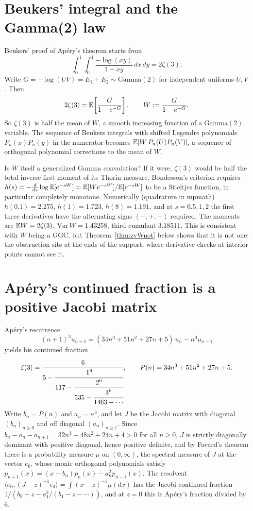 \section{Beukers' integral and the Gamma(2) law}

Beukers' proof of Ap\'ery's theorem \cite{beukers1979} starts from
\[
\int_0^1\!\!\int_0^1\frac{-\log(xy)}{1-xy}\,dx\,dy=2\zeta(3).
\]
Write $G=-\log(UV)=E_1+E_2\sim\mathrm{Gamma}(2)$ for independent uniforms $U,V$. Then
\[
2\zeta(3)=\mathbb{E}\!\left[\frac{G}{1-e^{-G}}\right],\qquad W:=\frac{G}{1-e^{-G}}.
\]
So $\zeta(3)$ is half the mean of $W$, a smooth increasing function of a Gamma$(2)$ variable. The sequence of Beukers integrals with shifted Legendre polynomials $P_n(x)P_n(y)$ in the numerator becomes $\mathbb{E}[W\,P_n(U)P_n(V)]$, a sequence of orthogonal polynomial corrections to the mean of $W$.

Is $W$ itself a generalized Gamma convolution? If it were, $\zeta(3)$ would be half the total inverse first moment of its Thorin measure. Bondesson's criterion \cite{bondesson1992} requires $h(s)=-\frac{d}{ds}\log\mathbb{E}[e^{-sW}]=\mathbb{E}[We^{-sW}]/\mathbb{E}[e^{-sW}]$ to be a Stieltjes function, in particular completely monotone. Numerically (quadrature in mpmath) $h(0.1)=2.275$, $h(1)=1.723$, $h(8)=1.191$, and at $s=0.5,1,2$ the first three derivatives have the alternating signs $(-,+,-)$ required. The moments are $\mathbb{E} W=2\zeta(3)$, $\mathrm{Var}\,W=1.43258$, third cumulant $3.18511$. This is consistent with $W$ being a GGC, but Theorem~\ref{thm:zvWnot} below shows that it is not one: the obstruction sits at the ends of the support, where derivative checks at interior points cannot see it.

\section{Ap\'ery's continued fraction is a positive Jacobi matrix}

Ap\'ery's recurrence
\[
(n+1)^3u_{n+1}=(34n^3+51n^2+27n+5)\,u_n-n^3u_{n-1}
\]
yields his continued fraction
\[
\zeta(3)=\cfrac{6}{5-\cfrac{1^6}{117-\cfrac{2^6}{535-\cfrac{3^6}{1463-\cdots}}}},\qquad
P(n)=34n^3+51n^2+27n+5 .
\]
Write $b_n=P(n)$ and $a_n=n^3$, and let $J$ be the Jacobi matrix with diagonal $(b_n)_{n\ge0}$ and off diagonal $(a_n)_{n\ge1}$. Since $b_n-a_n-a_{n+1}=32n^3+48n^2+24n+4>0$ for all $n\ge0$, $J$ is strictly diagonally dominant with positive diagonal, hence positive definite, and by Favard's theorem there is a probability measure $\mu$ on $(0,\infty)$, the spectral measure of $J$ at the vector $e_0$, whose monic orthogonal polynomials satisfy $p_{n+1}(x)=(x-b_n)p_n(x)-a_n^2p_{n-1}(x)$. The resolvent $\langle e_0,(J-z)^{-1}e_0\rangle=\int(x-z)^{-1}\mu(dx)$ has the Jacobi continued fraction $1/(b_0-z-a_1^2/(b_1-z-\cdots))$, and at $z=0$ this is Ap\'ery's fraction divided by $6$.

